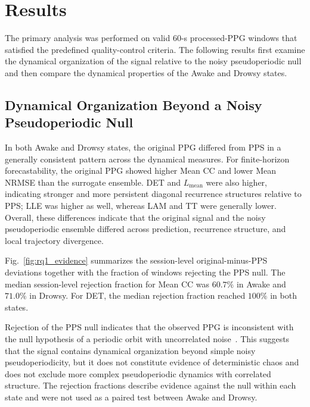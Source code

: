 \section{Results}

The primary analysis was performed on valid $60$-s processed-PPG windows that satisfied the predefined quality-control criteria. The following results first examine the dynamical organization of the signal relative to the noisy pseudoperiodic null and then compare the dynamical properties of the Awake and Drowsy states.


\subsection{Dynamical Organization Beyond a Noisy Pseudoperiodic Null}

In both Awake and Drowsy states, the original PPG differed from PPS in a generally consistent pattern across the dynamical measures. For finite-horizon forecastability, the original PPG showed higher Mean CC and lower Mean NRMSE than the surrogate ensemble. DET and $L_{\mathrm{mean}}$ were also higher, indicating stronger and more persistent diagonal recurrence structures relative to PPS; LLE was higher as well, whereas LAM and TT were generally lower. Overall, these differences indicate that the original signal and the noisy pseudoperiodic ensemble differed across prediction, recurrence structure, and local trajectory divergence.

Fig.~\ref{fig:rq1_evidence} summarizes the session-level original-minus-PPS deviations together with the fraction of windows rejecting the PPS null. The median session-level rejection fraction for Mean CC was $60.7\%$ in Awake and $71.0\%$ in Drowsy. For DET, the median rejection fraction reached $100\%$ in both states.

Rejection of the PPS null indicates that the observed PPG is inconsistent with the null hypothesis of a periodic orbit with uncorrelated noise~\cite{small2001}. This suggests that the signal contains dynamical organization beyond simple noisy pseudoperiodicity, but it does not constitute evidence of deterministic chaos and does not exclude more complex pseudoperiodic dynamics with correlated structure. The rejection fractions describe evidence against the null within each state and were not used as a paired test between Awake and Drowsy.

